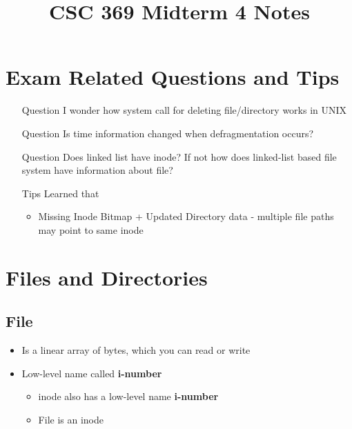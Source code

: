 \documentclass[12pt]{article}
\begin{document}
\title{CSC 369 Midterm 4 Notes}

\section{Exam Related Questions and Tips}

\begin{itemize}
    \item [\color{blue}Question\color{black}] I wonder how system call for deleting file/directory works in UNIX
    \item [\color{blue}Question\color{black}] Is time information changed when defragmentation occurs?
    \item [\color{blue}Question\color{black}] Does linked list have inode? If not how does linked-list based file system
    have information about file?
    \item [\color{green}Tips\color{black}] Learned that
    \begin{itemize}
        \item Missing Inode Bitmap + Updated Directory data - multiple file paths may point to same inode
    \end{itemize}
\end{itemize}

\section{Files and Directories}
\subsection{File}
\begin{itemize}
    \item Is a linear array of bytes, which you can read or write
    \item Low-level name called \textbf{i-number}
    \begin{itemize}
        \item inode also has a low-level name \textbf{i-number}
        \item File is an inode
    \end{itemize}
\end{itemize}
\end{document}
